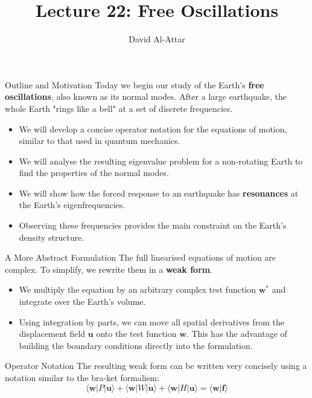 \documentclass{beamer}
\title[Lecture 22: Free Oscillations]{Lecture 22: Free Oscillations}
\author{David Al-Attar}
\institute{Michaelmas term 2024}
\date{}
\begin{document}

\begin{frame}
    \titlepage
\end{frame}

\begin{frame}{Outline and Motivation}
    Today we begin our study of the Earth's \textbf{free oscillations}, also known as its normal modes. After a large earthquake, the whole Earth "rings like a bell" at a set of discrete frequencies.
    \begin{itemize}
        \item We will develop a concise operator notation for the equations of motion, similar to that used in quantum mechanics.
        \pause
        \item We will analyse the resulting eigenvalue problem for a non-rotating Earth to find the properties of the normal modes.
        \pause
        \item We will show how the forced response to an earthquake has \textbf{resonances} at the Earth's eigenfrequencies.
        \pause
        \item Observing these frequencies provides the main constraint on the Earth's density structure.
    \end{itemize}
\end{frame}


\begin{frame}{A More Abstract Formulation}
    The full linearised equations of motion are complex. To simplify, we rewrite them in a \textbf{weak form}.
    \begin{itemize}
        \item We multiply the equation by an arbitrary complex test function $\mathbf{w}^*$ and integrate over the Earth's volume.
        \pause
        \item Using integration by parts, we can move all spatial derivatives from the displacement field $\mathbf{u}$ onto the test function $\mathbf{w}$. This has the advantage of building the boundary conditions directly into the formulation.
    \end{itemize}
    \pause
    \begin{block}{Operator Notation}
        The resulting weak form can be written very concisely using a notation similar to the bra-ket formalism:
        $$ \langle \mathbf{w}|P|\ddot{\mathbf{u}}\rangle + \langle \mathbf{w}|W|\dot{\mathbf{u}}\rangle + \langle \mathbf{w}|H|\mathbf{u}\rangle = \langle \mathbf{w}|\mathbf{f}\rangle $$
    \end{block}
\end{frame}
\end{document}
